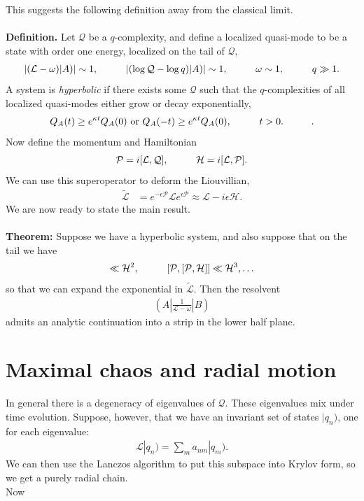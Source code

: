 \documentclass[JHEP,12pt]{article}
\begin{document}
This suggests the following definition away from the classical limit.\\ \\
\textbf{Definition.} Let $\mathcal{Q}$ be a $q$-complexity, and define a localized quasi-mode to be a state with order one energy, localized on the tail of $\mathcal{Q}$, 
\begin{align}
|(\mathcal{L}-\omega)|A)|\sim 1,\hspace{10 mm} |(\log \mathcal{Q}-\log q)|A)|\sim1,\hspace{10 mm}\omega\sim 1,\hspace{10 mm}q\gg 1.
\end{align}
A system is \emph{hyperbolic} if there exists some $\mathcal{Q}$ such that the $q$-complexities of all localized quasi-modes either grow or decay exponentially,
\begin{align}
Q_A(t)\ge e^{\kappa t}Q_A(0)\text{ or }Q_A(-t)\ge e^{\kappa t}Q_A(0),\hspace{10 mm}t>0. \hspace{10 mm}.
\end{align}
\indent Now define the momentum and Hamiltonian
\begin{align}
\mathcal{P}=i[\mathcal{L},\mathcal{Q}],\hspace{10 mm}\mathcal{H}=i[\mathcal{L},\mathcal{P}].
\end{align}
We can use this superoperator to deform the Liouvillian, 
\begin{align}\label{def}
\tilde{\mathcal{L}}&=e^{-\epsilon \mathcal{P}}\mathcal{L}e^{\epsilon\mathcal{P}}\approx \mathcal{L}-i\epsilon \mathcal{H}.
\end{align}
We are now ready to state the main result.\\ \\
\textbf{Theorem:} Suppose we have a hyperbolic system, and also suppose that on the tail we have
\begin{align}
[\mathcal{P},\mathcal{H}]\ll \mathcal{H}^2,\hspace{10 mm}[\mathcal{P},[\mathcal{P},\mathcal{H}]]\ll \mathcal{H}^3,\ldots
\end{align}
so that we can expand the exponential in $\tilde{\mathcal{L}}$. Then the resolvent 
\begin{align}
\left(A\left|\frac{1}{\mathcal{L}-\omega}\right|B\right)
\end{align}
admits an analytic continuation into a strip in the lower half plane.
\section{Maximal chaos and radial motion}
In general there is a degeneracy of eigenvalues of $\mathcal{Q}$. These eigenvalues mix under time evolution. Suppose, however, that we have an invariant set of states $|q_n)$, one for each eigenvalue:
\begin{align}
\mathcal{L}|q_n)=\sum_{m}a_{nm}|q_m).
\end{align}
We can then use the Lanczos algorithm to put this subspace into Krylov form, so we get a purely radial chain.\\
\indent Now 
\end{document}
